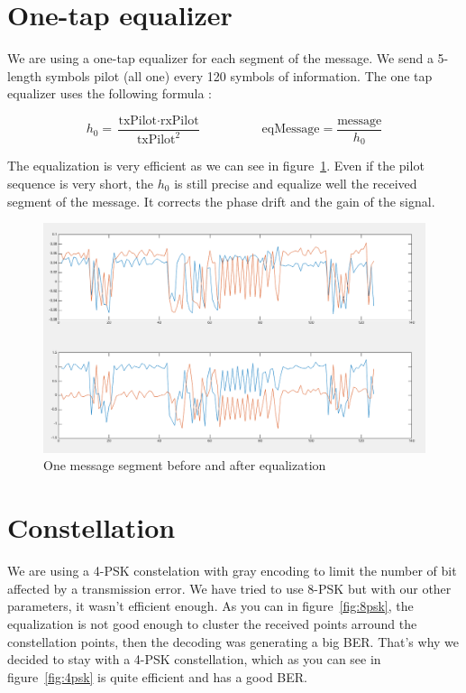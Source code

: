 \documentclass{article}
\begin{document}
\section{One-tap equalizer}

We are using a one-tap equalizer for each segment of the message. We send a 5-length symbols pilot (all one) every 120 symbols of information. The one tap equalizer uses the following formula :

\[
  h_0 = \frac{\text{txPilot} \cdot \text{rxPilot}}{\text{txPilot}^2}
  \hspace{2cm}
  \text{eqMessage} = \frac{\text{message}}{h_0}
\]

The equalization is very efficient as we can see in figure~\ref{fig:eq}. Even if the pilot sequence is very short, the $h_0$ is still precise and equalize well the received segment of the message. It corrects the phase drift and the gain of the signal. 


\begin{figure}
  \centering\includegraphics[width=\textwidth]{../presentation/eq.png}
  \caption{One message segment before and after equalization}
  \label{fig:eq}
\end{figure}


\section{Constellation}

We are using a 4-PSK constelation with gray encoding to limit the number of bit affected by a transmission error. We have tried to use 8-PSK but with our other parameters, it wasn't efficient enough. As you can in figure~\ref{fig:8psk}, the equalization is not good enough to cluster the received points arround the constellation points, then the decoding was generating a big BER. That's why we decided to stay with a 4-PSK constellation, which as you can see in figure~\ref{fig:4psk} is quite efficient and has a good BER.
\end{document}
